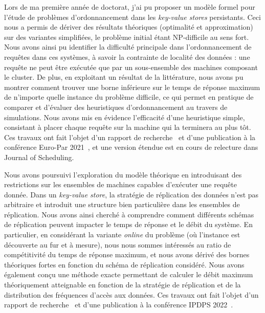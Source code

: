 \documentclass[12pt]{article}
\begin{document}
Lors de ma première année de doctorat, j'ai pu proposer un modèle formel pour l'étude de problèmes
d'ordonnancement dans les \emph{key-value stores} persistants.  
Ceci nous a permis de dériver des résultats théoriques (optimalité et approximation) sur des
variantes simplifiées, le problème initial étant NP-difficile au sens fort.  
Nous avons ainsi pu identifier la difficulté principale dans l'ordonnancement de requêtes dans ces
systèmes, à savoir la contrainte de localité des données : une requête ne peut être exécutée que par
un sous-ensemble des machines composant le cluster.  
De plus, en exploitant un résultat de la littérature, nous avons pu montrer comment trouver une
borne inférieure sur le temps de réponse maximum de n'importe quelle instance du problème difficile,
ce qui permet en pratique de comparer et d'évaluer des heuristiques d'ordonnancement au travers de
simulations.  
Nous avons mis en évidence l'efficacité d'une heuristique simple, consistant à placer chaque requête
sur la machine qui la terminera au plus tôt.  
Ces travaux ont fait l'objet d'un rapport de recherche~\cite{benmokhtar2021-rr} et d'une publication
à la conférence Euro-Par 2021~\cite{benmokhtar2021}, et une version étendue est en cours de
relecture dans Journal of Scheduling.

Nous avons poursuivi l'exploration du modèle théorique en introduisant des restrictions sur les
ensembles de machines capables d'exécuter une requête donnée.  
Dans un \emph{key-value store}, la stratégie de réplication des données n'est pas arbitraire et
introduit une structure bien particulière dans les ensembles de réplication.  
Nous avons ainsi cherché à comprendre comment différents schémas de réplication peuvent impacter le
temps de réponse et le débit du système.  
En particulier, en considérant la variante \emph{online} du problème (où l'instance est découverte
au fur et à mesure), nous nous sommes intéressés au ratio de compétitivité du temps de réponse
maximum, et nous avons dérivé des bornes théoriques fortes en fonction du schéma de réplication
considéré.  
Nous avons également conçu une méthode exacte permettant de calculer le débit maximum théoriquement
atteignable en fonction de la stratégie de réplication et de la distribution des fréquences d'accès
aux données.  
Ces travaux ont fait l'objet d'un rapport de recherche~\cite{canon2022-rr} et d'une publication
à la conférence IPDPS 2022~\cite{canon2022}.
\end{document}
